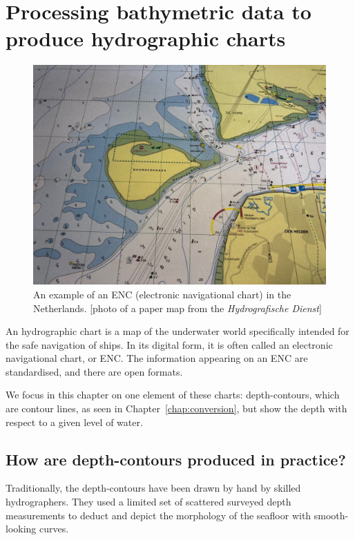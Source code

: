 
\graphicspath{{bathymetry/}}

\chapter{Processing bathymetric data to produce hydrographic charts}
\label{chap:bathymetry}

\begin{figure}[h]
  \centering
  \includegraphics[width=0.8\linewidth]{figs/enc_denhelder.jpeg}
  \caption{An example of an ENC (electronic navigational chart) in the Netherlands. [photo of a paper map from the \emph{Hydrografische Dienst}]}
\label{fig:enc.jpg}
\end{figure}

An hydrographic chart is a map of the underwater world specifically intended for the safe navigation of ships.
In its digital form, it is often called an electronic navigational chart, or ENC.
The information appearing on an ENC are standardised, and there are open formats.

%

We focus in this chapter on one element of these charts: depth-contours, which are contour lines, as seen in Chapter~\ref{chap:conversion}, but show the depth with respect to a given level of water.


%
\section{How are depth-contours produced in practice?}

Traditionally, the depth-contours have been drawn by hand by skilled hydrographers.
They used a limited set of scattered surveyed depth measurements to deduct and depict the morphology of the seafloor with smooth-looking curves.

